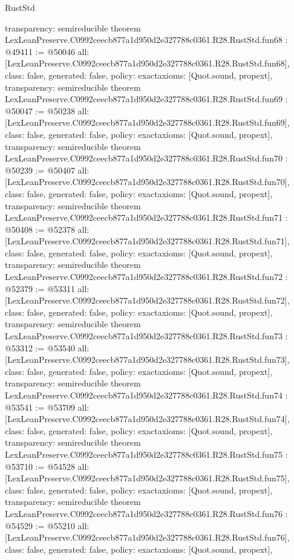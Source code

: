 \begin{lexlean}{RustStd}
\begin{coremodule}
{  transparency: semireducible
}
theorem LexLeanPreserve.C0992ceecb877a1d950d2e327788c0361.R28.RustStd.fun68 : @49411 := @50046 {
  all: [LexLeanPreserve.C0992ceecb877a1d950d2e327788c0361.R28.RustStd.fun68],
  class: false,
  generated: false,
  policy: exact{axioms: [Quot.sound, propext]},
  transparency: semireducible
}
theorem LexLeanPreserve.C0992ceecb877a1d950d2e327788c0361.R28.RustStd.fun69 : @50047 := @50238 {
  all: [LexLeanPreserve.C0992ceecb877a1d950d2e327788c0361.R28.RustStd.fun69],
  class: false,
  generated: false,
  policy: exact{axioms: [Quot.sound, propext]},
  transparency: semireducible
}
theorem LexLeanPreserve.C0992ceecb877a1d950d2e327788c0361.R28.RustStd.fun70 : @50239 := @50407 {
  all: [LexLeanPreserve.C0992ceecb877a1d950d2e327788c0361.R28.RustStd.fun70],
  class: false,
  generated: false,
  policy: exact{axioms: [Quot.sound, propext]},
  transparency: semireducible
}
theorem LexLeanPreserve.C0992ceecb877a1d950d2e327788c0361.R28.RustStd.fun71 : @50408 := @52378 {
  all: [LexLeanPreserve.C0992ceecb877a1d950d2e327788c0361.R28.RustStd.fun71],
  class: false,
  generated: false,
  policy: exact{axioms: [Quot.sound, propext]},
  transparency: semireducible
}
theorem LexLeanPreserve.C0992ceecb877a1d950d2e327788c0361.R28.RustStd.fun72 : @52379 := @53311 {
  all: [LexLeanPreserve.C0992ceecb877a1d950d2e327788c0361.R28.RustStd.fun72],
  class: false,
  generated: false,
  policy: exact{axioms: [Quot.sound, propext]},
  transparency: semireducible
}
theorem LexLeanPreserve.C0992ceecb877a1d950d2e327788c0361.R28.RustStd.fun73 : @53312 := @53540 {
  all: [LexLeanPreserve.C0992ceecb877a1d950d2e327788c0361.R28.RustStd.fun73],
  class: false,
  generated: false,
  policy: exact{axioms: [Quot.sound, propext]},
  transparency: semireducible
}
theorem LexLeanPreserve.C0992ceecb877a1d950d2e327788c0361.R28.RustStd.fun74 : @53541 := @53709 {
  all: [LexLeanPreserve.C0992ceecb877a1d950d2e327788c0361.R28.RustStd.fun74],
  class: false,
  generated: false,
  policy: exact{axioms: [Quot.sound, propext]},
  transparency: semireducible
}
theorem LexLeanPreserve.C0992ceecb877a1d950d2e327788c0361.R28.RustStd.fun75 : @53710 := @54528 {
  all: [LexLeanPreserve.C0992ceecb877a1d950d2e327788c0361.R28.RustStd.fun75],
  class: false,
  generated: false,
  policy: exact{axioms: [Quot.sound, propext]},
  transparency: semireducible
}
theorem LexLeanPreserve.C0992ceecb877a1d950d2e327788c0361.R28.RustStd.fun76 : @54529 := @55210 {
  all: [LexLeanPreserve.C0992ceecb877a1d950d2e327788c0361.R28.RustStd.fun76],
  class: false,
  generated: false,
  policy: exact{axioms: [Quot.sound, propext]},
}
\end{coremodule}
\end{lexlean}

